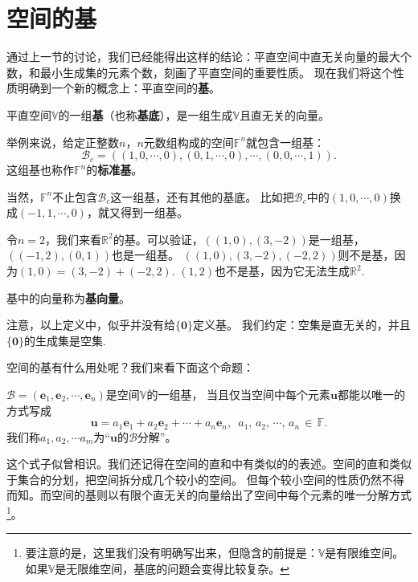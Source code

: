 \documentclass[12pt,UTF8,fontset=none]{ctexbook}
\begin{document}
\section{空间的基}
通过上一节的讨论，我们已经能得出这样的结论：平直空间中直无关向量的最大个数，和最小生成集的元素个数，刻画了平直空间的重要性质。
现在我们将这个性质明确到一个新的概念上：平直空间的{\bfseries 基}。

\begin{df}\label{df:2_3}
    平直空间$\mathbb{V}$的一组{\bfseries 基}（也称{\bfseries 基底}），是一组生成$\mathbb{V}$且直无关的向量。
\end{df}

举例来说，给定正整数$n$，$n$元数组构成的空间$\mathbb{F}^n$就包含一组基：
$$ \mathcal{B}_c = \left((1,0,\cdots,0),(0,1,\cdots,0),\cdots,(0,0,\cdots,1)\right).$$
这组基也称作$\mathbb{F}^n$的{\bfseries 标准基}。

当然，$\mathbb{F}^n$不止包含$\mathcal{B}_c$这一组基，还有其他的基底。
比如把$\mathcal{B}_c$中的$(1,0,\cdots,0)$换成$(-1,1,\cdots,0)$，就又得到一组基。

令$n = 2$，我们来看$\mathbb{R}^2$的基。可以验证，$\left((1,0),(3,-2)\right)$是一组基，$\left((-1,2),(0,1)\right)$也是一组基。
$\left((1,0),(3,-2),(-2,2)\right)$则不是基，因为$(1,0) = (3,-2) + (-2,2).$ 
$(1,2)$也不是基，因为它无法生成$\mathbb{R}^2.$

基中的向量称为\textbf{基向量}。

注意，以上定义中，似乎并没有给$\{\mathbf{0}\}$定义基。
我们约定：空集是直无关的，并且$\{\mathbf{0}\}$的生成集是空集.

空间的基有什么用处呢？我们来看下面这个命题：
\begin{pp}\label{pp:2_5}
    $ \mathcal{B} = (\mathbf{e}_1, \mathbf{e}_2, \cdots , \mathbf{e}_n )$是空间$\mathbb{V}$的一组基，
    当且仅当空间中每个元素$\mathbf{u}$都能以唯一的方式写成
    $$ \mathbf{u} = a_1\mathbf{e}_1 +a_2 \mathbf{e}_2 + \cdots + a_n\mathbf{e}_n, \,\,\, a_1,\,a_2,\,\cdots,\, a_n \,\in\,\mathbb{F}.$$
    我们称$a_1, a_2, \cdots a_m$为“$\mathbf{u}$的$\mathcal{B}$分解”。
\end{pp}
这个式子似曾相识。我们还记得在空间的直和中有类似的的表述。空间的直和类似于集合的分划，把空间拆分成几个较小的空间。
但每个较小空间的性质仍然不得而知。而空间的基则以有限个直无关的向量给出了空间中每个元素的唯一分解方式\footnote{要注意的是，这里我们没有明确写出来，但隐含的前提是：$\mathbb{V}$是有限维空间。如果$\mathbb{V}$是无限维空间，基底的问题会变得比较复杂。}。
\end{document}
